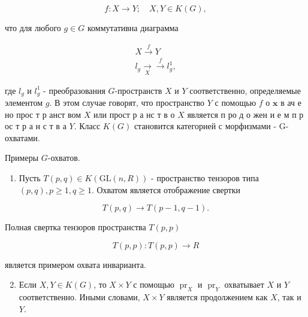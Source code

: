 \documentclass[10pt]{article}
\begin{document}
\[

f: X \longrightarrow Y ; \quad X, Y \in K(G),

\]



что для любого $g \in G$ коммутативна диаграмма



\[

\begin{gathered}

X \stackrel{f}{\longrightarrow} Y \\

l_{g} \underset{X}{\longrightarrow} \stackrel{f}{\longrightarrow} l_{g}^{1},

\end{gathered}

\]



где $l_{g}$ и $l_{g}^{1}$ - преобразования $G$-пространств $X$ и $Y$ соответственно, определяемые элементом $g$. В этом случае говорят, что пространство $Y$ с помощью $f$ о $\mathbf{x}$ в ач е но прос т р анст вом $X$ или прост р а нс т в о $X$ является п ро д о жен и е м п р ос т р а н с т в а $Y$. Класс $K(G)$ становится категорией с морфизмами - G-охватами.



Примеры $G$-охватов.



\begin{enumerate}

  \item Пусть $T(p, q) \in K(\mathrm{GL}(n, R))$ - пространство тензоров типа $(p, q), p \geqslant 1, q \geqslant 1$. Охватом является отображение свертки

\end{enumerate}



\[

T(p, q) \longrightarrow T(p-1, q-1) .

\]



Полная свертка тензоров пространства $T(p, p)$



\[

T(p, p): T(p, p) \rightarrow R

\]



является примером охвата инварианта.



\begin{enumerate}

  \setcounter{enumi}{1}

  \item Если $X, Y \in K(G)$, то $X \times Y$ с помощью $\operatorname{pr}_{X}$ и $\operatorname{pr}_{Y}$ охватывает $X$ и $Y$ соответственно. Иными словами, $X \times Y$ является продолжением как $X$, так и $Y$.

\end{enumerate}
\end{document}

